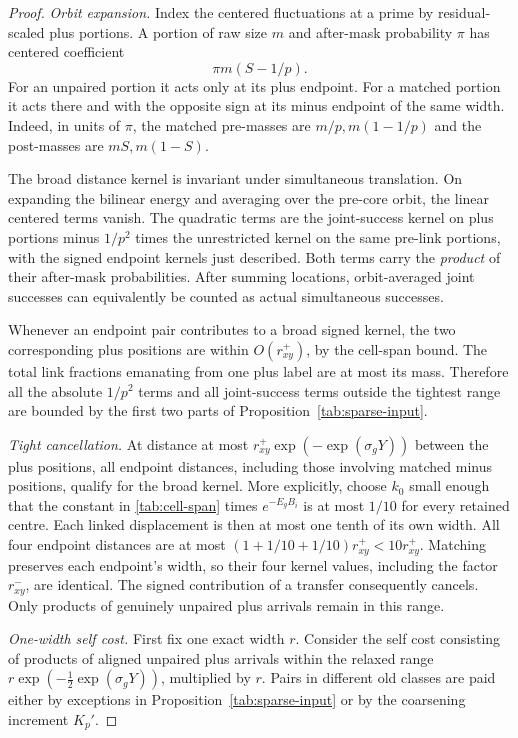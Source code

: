 \begin{proof}
\emph{Orbit expansion.}\quad
Index the centered fluctuations at a prime by residual-scaled plus
portions.  A portion of raw size $m$ and after-mask probability
$\pi$ has centered coefficient
\[
 \pi m(S-1/p).
\]
For an unpaired portion it acts only at its plus endpoint.  For a
matched portion it acts there and with the opposite sign at its
minus endpoint of the same width.  Indeed, in units of $\pi$, the
matched pre-masses are $m/p,m(1-1/p)$ and the post-masses are
$mS,m(1-S)$.

The broad distance kernel is invariant under simultaneous
translation.  On expanding the bilinear energy and averaging over
the pre-core orbit, the linear centered terms vanish.  The
quadratic terms are the joint-success kernel on plus portions minus
$1/p^2$ times the unrestricted kernel on the same pre-link
portions, with the signed endpoint kernels just described.  Both
terms carry the \emph{product} of their after-mask probabilities.
After summing locations, orbit-averaged joint successes can
equivalently be counted as actual simultaneous successes.

Whenever an endpoint pair contributes to a broad signed kernel,
the two corresponding plus positions are within $O(r_{xy}^+)$,
by the cell-span bound.  The total link fractions emanating from
one plus label are at most its mass.  Therefore all the absolute
$1/p^2$ terms and all joint-success terms outside the tightest
range are bounded by the first two parts of
Proposition~\ref{tab:sparse-input}.

\emph{Tight cancellation.}\quad
At distance at most
$r_{xy}^+\exp(-\exp(\sigma_gY))$ between the plus positions,
all endpoint distances, including those involving matched minus
positions, qualify for the broad kernel.  More explicitly, choose
$k_0$ small enough that the constant in \eqref{tab:cell-span}
times $e^{-E_gB_i}$ is at most $1/10$ for every retained centre.
Each linked displacement is then at most one tenth of its own
width.  All four endpoint distances are at most
$(1+1/10+1/10)r_{xy}^+<10r_{xy}^+$.  Matching preserves each
endpoint's width, so their four kernel values, including the
factor $r_{xy}^-$, are identical.  The signed contribution
of a transfer consequently cancels.  Only products of genuinely
unpaired plus arrivals remain in this range.

\emph{One-width self cost.}\quad
First fix one exact width $r$.  Consider the self cost consisting
of products of aligned unpaired plus arrivals within the relaxed
range $r\exp(-\tfrac12\exp(\sigma_gY))$, multiplied by $r$.
Pairs in different old classes are paid either by exceptions in
Proposition~\ref{tab:sparse-input} or by the coarsening increment
$K_p'$.


\end{proof}
